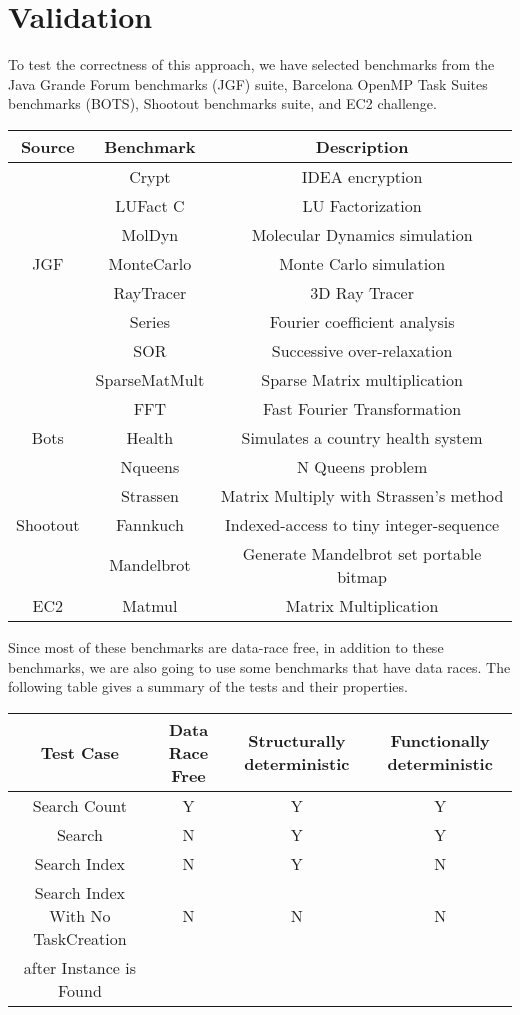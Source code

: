 \section{Validation}
To test the correctness of this approach, we have selected benchmarks from the Java Grande Forum benchmarks (JGF) suite, Barcelona OpenMP Task Suites benchmarks (BOTS), Shootout benchmarks suite, and EC2 challenge. \\

\begin{tabular}{|c|c|c|}
\hline
Source & Benchmark & Description \\
\hline
\hline
      & Crypt & IDEA encryption \\
	& LUFact C & LU Factorization \\
  	   & MolDyn & Molecular Dynamics simulation \\
JGF & MonteCarlo & Monte Carlo simulation \\
      & RayTracer & 3D Ray Tracer \\
      & Series & Fourier coefficient analysis \\
      & SOR & Successive over-relaxation \\
      & SparseMatMult & Sparse Matrix multiplication \\
      \hline
      & FFT  & Fast Fourier Transformation \\
	Bots & Health & Simulates a country health system \\
& Nqueens & N Queens problem \\
& Strassen & Matrix Multiply with Strassen’s method \\
\hline
Shootout & Fannkuch & Indexed-access to tiny integer-sequence \\
& Mandelbrot & Generate Mandelbrot set portable bitmap \\
\hline
EC2 & Matmul & Matrix Multiplication \\
\hline
\end{tabular}

Since most of these benchmarks are data-race free, in addition to these benchmarks, we are also going to use some benchmarks that have data races. The following table gives a summary of the tests and their properties. 

\begin{tabular}{ | c | c | c | c |}
  \hline
  Test Case & Data Race Free & Structurally deterministic & Functionally deterministic \\
  \hline
  Search Count & Y & Y & Y \\
  \hline
  Search & N & Y & Y \\
  \hline
  Search Index & N & Y & N\\
  \hline 
  Search Index With No TaskCreation & N & N & N\\
   after Instance is Found  & & & \\
  \hline 
\end{tabular}